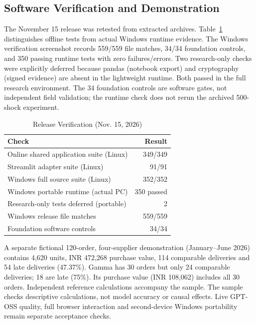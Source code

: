 \documentclass[conference,a4paper]{IEEEtran}
\begin{document}
\subsection{Software Verification and Demonstration}
The November 15 release was retested from extracted archives. Table~\ref{tab:software} distinguishes offline tests from actual Windows runtime evidence. The Windows verification screenshot records 559/559 file matches, 34/34 foundation controls, and 350 passing runtime tests with zero failures/errors. Two research-only checks were explicitly deferred because pandas (notebook export) and cryptography (signed evidence) are absent in the lightweight runtime. Both passed in the full research environment. The 34 foundation controls are software gates, not independent field validation; the runtime check does not rerun the archived 500-shock experiment.
\begin{table}[t]
\caption{Release Verification (Nov. 15, 2026)}
\centering\footnotesize
\begin{tabular}{lr}
\toprule
Check & Result\\
\midrule
Online shared application suite (Linux) & 349/349\\
Streamlit adapter suite (Linux) & 91/91\\
Windows full source suite (Linux) & 352/352\\
Windows portable runtime (actual PC) & 350 passed\\
Research-only tests deferred (portable) & 2\\
Windows release file matches & 559/559\\
Foundation software controls & 34/34\\
\bottomrule
\end{tabular}
\label{tab:software}
\end{table}
A separate fictional 120-order, four-supplier demonstration (January--June 2026) contains 4,620 units, INR 472,268 purchase value, 114 comparable deliveries and 54 late deliveries (47.37\%). Gamma has 30 orders but only 24 comparable deliveries; 18 are late (75\%). Its purchase value (INR 108,062) includes all 30 orders. Independent reference calculations accompany the sample. The sample checks descriptive calculations, not model accuracy or causal effects. Live GPT-OSS quality, full browser interaction and second-device Windows portability remain separate acceptance checks.
\end{document}
